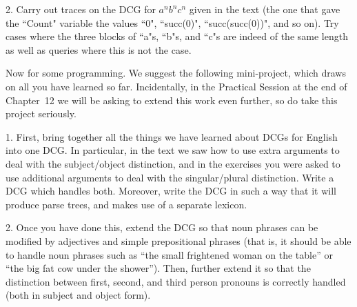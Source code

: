 2. Carry out traces on the DCG for $a^nb^nc^n$ given in the text
(the one that gave the ``Count" variable the values ``0", ``succ(0)",
``succ(succ(0))", and so on). Try cases where the three blocks of ``a"s,
``b"s, and ``c"s are indeed of the same length as well as queries where
this is not the case.

Now for some programming. We suggest the following mini-project, which
draws on all you have learned so far. Incidentally, in the Practical
Session at the end of Chapter~12 we will be asking to extend this work
even further, so do take this project seriously.

1. First, bring together all the things we have learned about DCGs
for English into one DCG. In particular, in the text we saw how to use
extra arguments to deal with the subject/object distinction, and in
the exercises you were asked to use additional arguments to deal with
the singular/plural distinction. Write a DCG which handles
both. Moreover, write the DCG in such a way that it will produce parse
trees, and makes use of a separate lexicon.

2. Once you have done this, extend the DCG so that noun phrases can
be modified by adjectives and simple prepositional phrases (that is,
it should be able to handle noun phrases such as ``the small
frightened woman on the table'' or ``the big fat cow under the
shower''). Then, further extend it so that the distinction between
first, second, and third person pronouns is correctly handled (both in
subject and object form).

